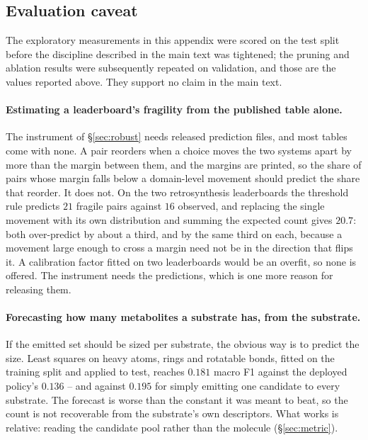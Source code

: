 \subsection{Evaluation caveat}

The exploratory measurements in this appendix were scored on the test split before the discipline
described in the main text was tightened; the pruning and ablation results were subsequently
repeated on validation, and those are the values reported above. They support no claim in the main
text.
\paragraph{Estimating a leaderboard's fragility from the published table alone.} The instrument of
\S\ref{sec:robust} needs released prediction files, and most tables come with none. A pair reorders
when a choice moves the two systems apart by more than the margin between them, and the margins are
printed, so the share of pairs whose margin falls below a domain-level movement should predict the
share that reorder. It does not. On the two retrosynthesis leaderboards the threshold rule predicts
$21$ fragile pairs against $16$ observed, and replacing the single movement with its own
distribution and summing the expected count gives $20.7$: both over-predict by about a third, and by
the same third on each, because a movement large enough to cross a margin need not be in the
direction that flips it. A calibration factor fitted on two leaderboards would be an overfit, so
none is offered. The instrument needs the predictions, which is one more reason for releasing them.

\paragraph{Forecasting how many metabolites a substrate has, from the substrate.} If the emitted
set should be sized per substrate, the obvious way is to predict the size. Least squares on heavy
atoms, rings and rotatable bonds, fitted on the training split and applied to test, reaches $0.181$
macro F1 against the deployed policy's $0.136$ -- and against $0.195$ for simply emitting one
candidate to every substrate. The forecast is worse than the constant it was meant to beat, so the
count is not recoverable from the substrate's own descriptors. What works is relative: reading the
candidate pool rather than the molecule (\S\ref{sec:metric}).

